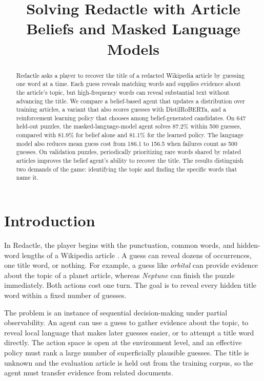 \documentclass[conference]{IEEEtran}
\title{Solving Redactle with Article Beliefs and Masked Language Models}
\author{\IEEEauthorblockN{[Author name]}\IEEEauthorblockA{CS238, Stanford University}}
\begin{document}
\maketitle

\begin{abstract}
Redactle asks a player to recover the title of a redacted Wikipedia article by guessing one word at a time. Each guess reveals matching words and supplies evidence about the article's topic, but high-frequency words can reveal substantial text without advancing the title. We compare a belief-based agent that updates a distribution over training articles, a variant that also scores guesses with DistilRoBERTa, and a reinforcement learning policy that chooses among belief-generated candidates. On 647 held-out puzzles, the masked-language-model agent solves 87.2\% within 500 guesses, compared with 81.9\% for belief alone and 81.1\% for the learned policy. The language model also reduces mean guess cost from 186.1 to 156.5 when failures count as 500 guesses. On validation puzzles, periodically prioritizing rare words shared by related articles improves the belief agent's ability to recover the title. The results distinguish two demands of the game: identifying the topic and finding the specific words that name it.
\end{abstract}

\section{Introduction}
In Redactle, the player begins with the punctuation, common words, and hidden-word lengths of a Wikipedia article \cite{redactle}. A guess can reveal dozens of occurrences, one title word, or nothing. For example, a guess like \emph{orbital} can provide evidence about the topic of a planet article, whereas \emph{Neptune} can finish the puzzle immediately. Both actions cost one turn. The goal is to reveal every hidden title word within a fixed number of guesses.

The problem is an instance of sequential decision-making under partial observability. An agent can use a guess to gather evidence about the topic, to reveal local language that makes later guesses easier, or to attempt a title word directly. The action space is open at the environment level, and an effective policy must rank a large number of superficially plausible guesses. The title is unknown and the evaluation article is held out from the training corpus, so the agent must transfer evidence from related documents.
\end{document}
